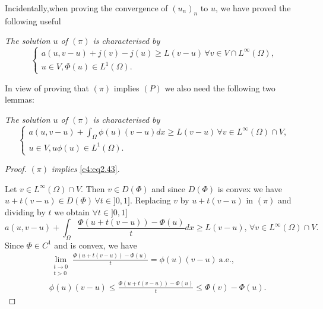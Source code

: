  Incidentally,\pageoriginale when proving the convergence of $(u_n)_n$ to $u$, we have proved the following useful

 \begin{lemma}\label{c4:lem2.2}%
{\em The solution $u$ of $(\pi)$ is characterised by}
\begin{equation}
\begin{cases}
a (u, v-u) + j (v) - j (u) \geq L (v - u)\, \forall v \in V \cap L^\infty (\Omega), \\
u \in V, \Phi (u) \in L^1 (\Omega). \tag{2.42}\label{c4:eq2.42}
\end{cases}
\end{equation}
 
In view of proving that $(\pi)$ implies $(P)$ we also need the following two lemmas:
 \end{lemma}

\begin{lemma}\label{c4:lem2.3} %
{\em The solution $u$ of $(\pi)$ is characterised by}
\begin{equation}
\begin{cases}
a (u, v-u) +  \int_\Omega  \phi (u) (v-u) dx  \geq L (v-u)\, \forall v \in L^\infty (\Omega) \cap V, \\
u \in V, u \phi (u) \in L^1 (\Omega). \tag{2.43}\label{c4:eq2.43}
\end{cases}
\end{equation}
 \end{lemma} 
 
 \begin{proof}
$(\pi)$ {\em implies} \eqref{c4:eq2.43}.

Let $v \in L^\infty (\Omega) \cap V$. Then $v \in D (\Phi)$ and since
$D (\Phi)$ is convex we have $u + t (v - u) \in D (\Phi)\, \forall
t \in ] 0, 1]$. Replacing $v$ by $u + t (v-u)$ in $(\pi)$ and dividing
    by $t$ we obtain $\forall t \in ]0, 1]$ 
\begin{equation}
a (u, v-u) + \int_{\Omega} \frac{\Phi (u+t (v-u)) - \Phi (u)} {t} dx
\geq L (v-u),\, \forall v \in L^\infty (\Omega) \cap
V. \tag{2.44}\label{c4:eq2.44} 
\end{equation}
Since $\Phi \in C^1$ and is convex, we have
\begin{align}
& \lim_{\substack{t \to 0\\t >0}} \frac{\Phi (u+t (v-u)) - \Phi (u)}
  {t} = \phi (u) (v-u) ~\text{a.e.,} \tag{2.45}\label{c4:eq2.45}\\ 
& \phi (u) (v-u) \leq \frac{\Phi (u+t (v-u)) -\Phi (u)} {t} \leq \Phi
  (v) -\Phi (u). \tag{2.46}\label{c4:eq2.46} 
\end{align}
\end{proof}
 
